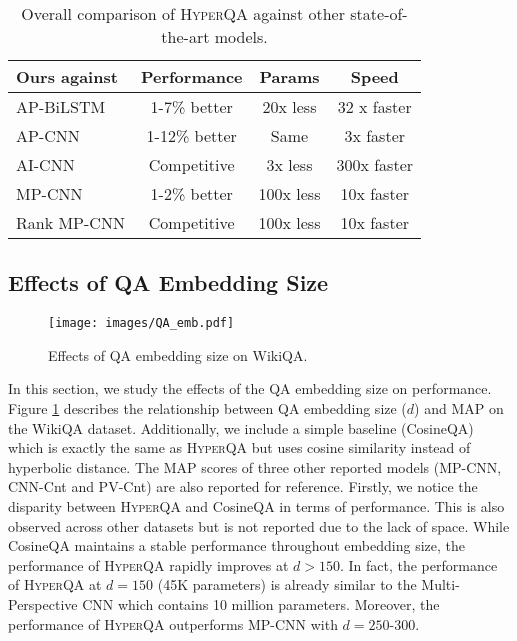 \documentclass[sigconf]{acmart}
\begin{document}
\begin{table}[htbp]
  \centering
\small
    \begin{tabular}{lccc}
    \hline
    Ours against & Performance & Params & Speed \\
    \hline
    AP-BiLSTM & 1-7\% better & 20x less & 32 x faster \\
    AP-CNN & 1-12\% better & Same  & 3x faster \\
    AI-CNN & Competitive & 3x less & 300x faster \\
    MP-CNN & 1-2\% better & 100x less & 10x faster \\
    Rank MP-CNN & Competitive & 100x less & 10x faster \\
    \hline
    \end{tabular}\caption{Overall comparison of \textsc{HyperQA} against other state-of-the-art models.}
  \label{tab:addlabel}\end{table}


\subsection{Effects of QA Embedding Size}
\begin{figure}[H] 
\begin{center}
\texttt{[image: images/QA\_emb.pdf]}
\caption{Effects of QA embedding size on WikiQA.}
\label{emb_size}
\end{center}
\end{figure}
\vspace{-1em}

In this section, we study the effects of the QA embedding size on performance. Figure \ref{emb_size} describes the relationship between QA embedding size ($d$) and MAP on the WikiQA dataset. Additionally, we include a simple baseline (CosineQA) which is exactly the same as \textsc{HyperQA} but uses cosine similarity instead of hyperbolic distance. The MAP scores of three other reported models (MP-CNN, CNN-Cnt and PV-Cnt) are also reported for reference. Firstly, we notice the disparity between \textsc{HyperQA} and CosineQA in terms of performance. This is also observed across other datasets but is not reported due to the lack of space. While CosineQA maintains a stable performance throughout embedding size, the performance of \textsc{HyperQA} rapidly improves at $d>150$. In fact, the performance of \textsc{HyperQA} at $d=150$ (45K parameters) is already similar to the Multi-Perspective CNN \cite{DBLP:conf/emnlp/HeGL15} which contains 10 million parameters. Moreover, the performance of \textsc{HyperQA} outperforms MP-CNN with $d=250$-$300$.
\end{document}
